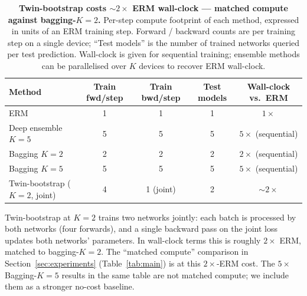 \begin{table}[h]
  \centering
  \caption{\textbf{\boldmath Twin-bootstrap costs $\sim$$2\times$ ERM
    wall-clock --- matched compute against bagging-$K{=}2$.}
    Per-step compute footprint of each method, expressed in units of
    an ERM training step.  Forward / backward counts are per training
    step on a single device; ``Test models'' is the number of
    trained networks queried per test prediction.  Wall-clock is
    given for sequential training; ensemble methods can be
    parallelised over $K$ devices to recover ERM wall-clock.}
  \label{tab:compute}
  \small
  \begin{tabular}{lcccc}
    \toprule
    Method & Train fwd/step & Train bwd/step & Test models & Wall-clock vs.\ ERM \\
    \midrule
    ERM                          & 1 & 1 & 1 & $1\times$ \\
    Deep ensemble $K{=}5$        & 5 & 5 & 5 & $5\times$ (sequential) \\
    Bagging $K{=}2$              & 2 & 2 & 2 & $2\times$ (sequential) \\
    Bagging $K{=}5$              & 5 & 5 & 5 & $5\times$ (sequential) \\
    Twin-bootstrap ($K{=}2$, joint)  & 4 & 1 (joint) & 2 & ${\sim}2\times$ \\
    \bottomrule
  \end{tabular}
\end{table}

Twin-bootstrap at $K{=}2$ trains two networks jointly: each batch is
processed by both networks (four forwards), and a single backward pass
on the joint loss updates both networks' parameters.  In wall-clock
terms this is roughly $2\times$ ERM, matched to bagging-$K{=}2$.  The
``matched compute'' comparison in Section~\ref{sec:experiments}
(Table~\ref{tab:main}) is at this $2\times$-ERM cost.  The
$5\times$ Bagging-$K{=}5$ results in the same table are not matched
compute; we include them as a stronger no-cost baseline.

